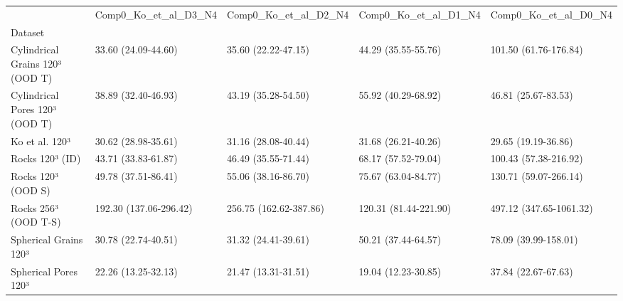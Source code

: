 \begin{tabular}{lllll}
\toprule
 & Comp0_Ko_et_al_D3_N4 & Comp0_Ko_et_al_D2_N4 & Comp0_Ko_et_al_D1_N4 & Comp0_Ko_et_al_D0_N4 \\
Dataset &  &  &  &  \\
\midrule
Cylindrical Grains 120³ (OOD T) & 33.60 (24.09-44.60) & 35.60 (22.22-47.15) & 44.29 (35.55-55.76) & 101.50 (61.76-176.84) \\
Cylindrical Pores 120³ (OOD T) & 38.89 (32.40-46.93) & 43.19 (35.28-54.50) & 55.92 (40.29-68.92) & 46.81 (25.67-83.53) \\
Ko et al. 120³ & 30.62 (28.98-35.61) & 31.16 (28.08-40.44) & 31.68 (26.21-40.26) & 29.65 (19.19-36.86) \\
Rocks 120³ (ID) & 43.71 (33.83-61.87) & 46.49 (35.55-71.44) & 68.17 (57.52-79.04) & 100.43 (57.38-216.92) \\
Rocks 120³ (OOD S) & 49.78 (37.51-86.41) & 55.06 (38.16-86.70) & 75.67 (63.04-84.77) & 130.71 (59.07-266.14) \\
Rocks 256³ (OOD T-S) & 192.30 (137.06-296.42) & 256.75 (162.62-387.86) & 120.31 (81.44-221.90) & 497.12 (347.65-1061.32) \\
Spherical Grains 120³ & 30.78 (22.74-40.51) & 31.32 (24.41-39.61) & 50.21 (37.44-64.57) & 78.09 (39.99-158.01) \\
Spherical Pores 120³ & 22.26 (13.25-32.13) & 21.47 (13.31-31.51) & 19.04 (12.23-30.85) & 37.84 (22.67-67.63) \\
\bottomrule
\end{tabular}
